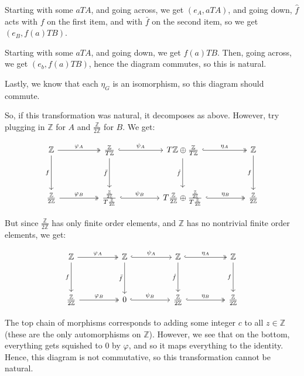 \documentclass{article}
\begin{document}
\begin{customproof}
Starting with some $aTA$, and going across, we get $(e_A, aTA)$, and going down, $\hat{f}$ acts with $f$ on the first item, and with $\bar{f}$ on the second item, so we get $(e_B, f(a)TB)$.

Starting with some $aTA$, and going down, we get $f(a)TB$. Then, going across, we get $(e_b, f(a)TB)$, hence the diagram commutes, so this is natural.

Lastly, we know that each $\eta_G$ is an isomorphism, so this diagram should commute.

So, if this transformation was natural, it decomposes as above. However, try plugging in $\mathbb{Z}$ for $A$ and $\frac{\mathbb{Z}}{2 \mathbb{Z}}$ for $B$. We get: 

\[\begin{tikzcd}
	\mathbb{Z} && \frac{\mathbb{Z}}{T \mathbb{Z}} && T\mathbb{Z} \oplus \frac{\mathbb{Z}}{T \mathbb{Z}} && \mathbb{Z} \\
    \\
    \frac{\mathbb{Z}}{2 \mathbb{Z}} && \frac{\frac{\mathbb{Z}}{2 \mathbb{Z}}}{T \frac{\mathbb{Z}}{2 \mathbb{Z}}} && T\frac{\mathbb{Z}}{2 \mathbb{Z}} \oplus \frac{\frac{\mathbb{Z}}{2 \mathbb{Z}}}{T\frac{\mathbb{Z}}{2 \mathbb{Z}}} && \frac{\mathbb{Z}}{2 \mathbb{Z}}
    \arrow[two heads, from=1-1, to=1-3, "\varphi_A"]
    \arrow[hook, from=1-3, to=1-5, "\psi_A"]
    \arrow[hook, two heads, from=1-5, to=1-7, "\eta_A"]
    \arrow[two heads, from=3-1, to=3-3, "\varphi_B"]
    \arrow[hook, from=3-3, to=3-5, "\psi_B"]
    \arrow[hook, two heads, from=3-5, to=3-7, "\eta_B"]
    \arrow[from=1-1, to=3-1, "f"']
    \arrow[from=1-3, to=3-3, "\bar{f}"']
    \arrow[from=1-5, to=3-5, "\hat{f}"']
    \arrow[from=1-7, to=3-7, "f"']
\end{tikzcd}\]

But since $\frac{\mathbb{Z}}{2 \mathbb{Z}}$ has only finite order elements, and $\mathbb{Z}$ has no nontrivial finite order elements, we get: 

\[\begin{tikzcd}
	\mathbb{Z} && \mathbb{Z} && \mathbb{Z} && \mathbb{Z} \\
    \\
    \frac{\mathbb{Z}}{2 \mathbb{Z}} && 0 && \frac{\mathbb{Z}}{2 \mathbb{Z}} && \frac{\mathbb{Z}}{2 \mathbb{Z}}
    \arrow[two heads, from=1-1, to=1-3, "\varphi_A"]
    \arrow[hook, from=1-3, to=1-5, "\psi_A"]
    \arrow[hook, two heads, from=1-5, to=1-7, "\eta_A"]
    \arrow[two heads, from=3-1, to=3-3, "\varphi_B"]
    \arrow[hook, from=3-3, to=3-5, "\psi_B"]
    \arrow[hook, two heads, from=3-5, to=3-7, "\eta_B"]
    \arrow[from=1-1, to=3-1, "f"']
    \arrow[from=1-3, to=3-3, "\bar{f}"']
    \arrow[from=1-5, to=3-5, "\hat{f}"']
    \arrow[from=1-7, to=3-7, "f"']
\end{tikzcd}\]

The top chain of morphisms corresponds to adding some integer $c$ to all $z \in \mathbb{Z}$ (these are the only automorphisms on $\mathbb{Z}$). However, we see that on the bottom, everything gets squished to $0$ by $\varphi$, and so it maps everything to the identity. Hence, this diagram is not commutative, so this transformation cannot be natural.
\end{customproof}
\end{document}
